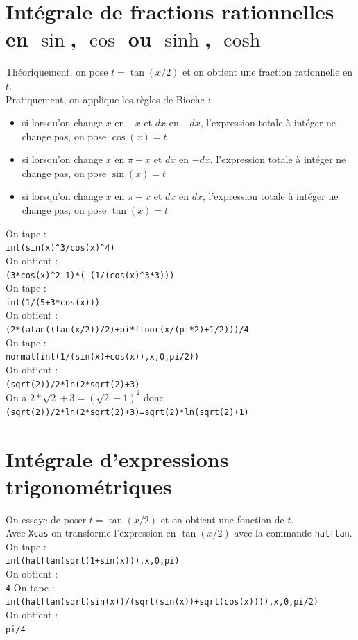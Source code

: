 \documentclass[a4paper,11pt]{book}
\begin{document}
\section{Int\'egrale de fractions rationnelles en $\sin$, $\cos$ ou $\sinh$, $\cosh$}
Th\'eoriquement, on pose $t=\tan(x/2)$ et on obtient une fraction rationnelle 
en $t$.\\
Pratiquement, on applique les r\`egles de Bioche :
\begin{itemize}
\item si lorsqu'on change $x$ en $-x$ et $dx$ en $-dx$, l'expression totale 
\`a int\'eger ne change pas, on pose $\cos(x)=t$ 
\item si lorsqu'on change $x$ en $\pi-x$ et $dx$ en $-dx$, l'expression totale 
\`a int\'eger ne change pas, on pose $\sin(x)=t$ 
\item si lorsqu'on change  $x$ en $\pi+x$ et $dx$ en $dx$, l'expression totale
\`a int\'eger ne change pas, on pose $\tan(x)=t$ 
\end{itemize}
\noindent On tape :\\
{\tt int(sin(x)\verb|^|3/cos(x)\verb|^|4)}\\   
On obtient :\\
{\tt (3*cos(x)\verb|^|2-1)*(-(1/(cos(x)\verb|^|3*3)))}\\
On tape :\\
{\tt int(1/(5+3*cos(x)))}\\   
On obtient :\\
{\tt (2*(atan((tan(x/2))/2)+pi*floor(x/(pi*2)+1/2)))/4}\\
On tape :\\
{\tt normal(int(1/(sin(x)+cos(x)),x,0,pi/2))}\\   
On obtient :\\
{\tt (sqrt(2))/2*ln(2*sqrt(2)+3)}\\
On a $2*\sqrt 2+3=(\sqrt 2+1)^2$ donc \\
{\tt (sqrt(2))/2*ln(2*sqrt(2)+3)=sqrt(2)*ln(sqrt(2)+1)}
\section{Int\'egrale d'expressions trigonom\'etriques} 
On essaye de poser $t=\tan(x/2)$ et on obtient une fonction de $t$.\\
Avec {\tt Xcas} on transforme l'expression en $\tan(x/2)$ avec la commande 
{\tt halftan}.\\
On tape :\\
{\tt int(halftan(sqrt(1+sin(x))),x,0,pi)}\\   
On obtient :\\
{\tt 4}
On tape :\\
{\tt int(halftan(sqrt(sin(x))/(sqrt(sin(x))+sqrt(cos(x)))),x,0,pi/2)}\\   
On obtient :\\
{\tt pi/4}
\end{document}
